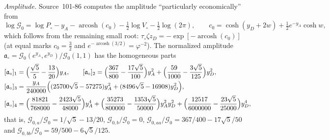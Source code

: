 \documentclass[11pt,a4paper]{article}
\numberwithin{equation}{section}
\theoremstyle{definition}\newtheorem{definition}[theorem]{Definition}
\theoremstyle{remark}\newtheorem{remark}[theorem]{Remark}
\begin{document}
\emph{Amplitude.} Source~101-86 computes the amplitude ``particularly
economically'' from
\[
 \log\mathcal G_0=\log P_\circ-y_A-\operatorname{arcosh}(c_0)-\tfrac12\log V_\circ-\tfrac12\log(2\pi),
 \qquad c_0=\cosh(y_D+2w)+\tfrac12e^{-y_A}\cosh w,
\]
which follows from the remaining small root:
$\tau_\circ\zeta z_D=-\exp[-\operatorname{arcosh}(c_0)]$ (at equal marks
$c_0=\frac32$ and $e^{-\operatorname{arcosh}(3/2)}=\varphi^{-2}$). The normalized
amplitude $\mathfrak a_\circ=\mathcal G_0(e^{y_A},e^{y_D})/\mathcal G_0(1,1)$ has
the homogeneous parts
\begin{align}\label{fce:dx:eq:ampjets}
 [\mathfrak a_\circ]_1&=\Bigl(\frac{\sqrt5}5-\frac{13}{20}\Bigr)y_A,\qquad
 [\mathfrak a_\circ]_2=\Bigl(\frac{367}{800}-\frac{17\sqrt5}{100}\Bigr)y_A^2
 +\Bigl(\frac{59}{1000}-\frac{3\sqrt5}{125}\Bigr)y_D^2,\notag\\
 [\mathfrak a_\circ]_3&=\frac{y_A}{240000}\Bigl((25700\sqrt5-57275)y_A^2+(8496\sqrt5-16908)y_D^2\Bigr),\\
 [\mathfrak a_\circ]_4&=\Bigl(\frac{81821}{768000}-\frac{2423\sqrt5}{48000}\Bigr)y_A^4
 +\Bigl(\frac{35273}{800000}-\frac{1353\sqrt5}{50000}\Bigr)y_A^2y_D^2
 +\Bigl(\frac{12517}{6000000}-\frac{23\sqrt5}{25000}\Bigr)y_D^4,\notag
\end{align}
that is, $\mathcal G_{0,a}/\mathcal G_0=1/\sqrt5-13/20$, $\mathcal G_{0,b}/\mathcal G_0=0$,
$\mathcal G_{0,aa}/\mathcal G_0=367/400-17\sqrt5/50$ and
$\mathcal G_{0,bb}/\mathcal G_0=59/500-6\sqrt5/125$.
\end{document}
